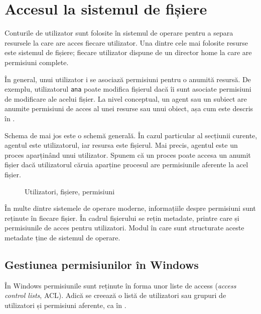 \section{Accesul la sistemul de fișiere}
\label{sec:user:fs-access}

Conturile de utilizator sunt folosite în sistemul de operare pentru a separa
resursele la care are acces fiecare utilizator. Una dintre cele mai folosite resurse
este sistemul de fișiere; fiecare utilizator dispune de un director home la care
are permisiuni complete.

În general, unui utilizator i se asociază permisiuni pentru o anumită resursă.
De exemplu, utilizatorul \texttt{ana} poate modifica fișierul  dacă îi sunt
asociate permisiuni de modificare ale acelui fișier. La nivel conceptual, un agent
sau un subiect are anumite permisiuni de acces al unei resurse sau unui obiect,
așa cum este descris în .

Schema de mai jos este o schemă generală. În cazul particular al secțiunii
curente, agentul este utilizatorul, iar resursa este fișierul. Mai precis,
agentul este un proces aparținând unui utilizator. Spunem că un proces poate
accesa un anumit fișier dacă utilizatorul căruia aparține procesul are
permisiunile aferente la acel fișier.

\begin{figure}[htbp]
  \centering
  \def\svgwidth{0.7\columnwidth}
  
  \caption{Utilizatori, fișiere, permisiuni}
  \label{fig:user:user-file-perm}
\end{figure}

În multe dintre sistemele de operare moderne, informațiile despre permisiuni sunt reținute în
fiecare fișier. În cadrul fișierului se rețin metadate, printre care și
permisiunile de acces pentru utilizatori. Modul în care sunt structurate aceste
metadate ține de sistemul de operare.

\subsection{Gestiunea permisiunilor în Windows}
\label{sec:user:windows-perm}

În Windows permisiunile sunt reținute în forma unor liste de access (\textit{access
control lists}, ACL). Adică se creează o listă
de utilizatori sau grupuri de utilizatori și permisiuni aferente, ca în .

